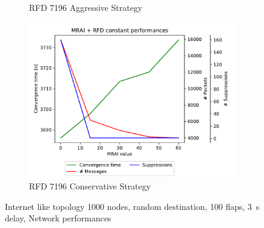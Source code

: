 \begin{figure}[h]
\begin{subfigure}[b]{0.325\textwidth}
         \caption{RFD 7196 Aggressive Strategy}
         \label{fig:1000_7196RFDA_multiMRAI_elephants}
     \end{subfigure}
     \hfill
     \begin{subfigure}[b]{0.325\textwidth}
         \centering
         \includegraphics[width=\textwidth]{images/RFD/miceVSelephants/MultiMRAI/elephants/cisco_1000_RFD_7196_conservative-constant_mrai_rfd_evolution.pdf}
         \caption{RFD 7196 Conservative Strategy}
         \label{fig:1000_7196RFDC_multiMRAI_elephants}
     \end{subfigure}
		\caption{Internet like topology \num{1000} nodes, random destination, \num{100} flaps, \SI{3}{\second} delay, Network performances}
        \label{fig:1000_RFD_multiMRAI_elephants}
\end{figure}

